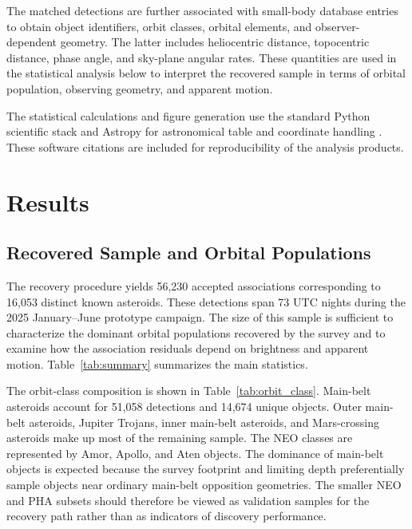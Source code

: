 \documentclass[referee]{raa}
\begin{document}
The matched detections are further associated with small-body database entries to obtain object identifiers, orbit classes, orbital elements, and observer-dependent geometry. The latter includes heliocentric distance, topocentric distance, phase angle, and sky-plane angular rates. These quantities are used in the statistical analysis below to interpret the recovered sample in terms of orbital population, observing geometry, and apparent motion.

The statistical calculations and figure generation use the standard Python scientific stack and Astropy for astronomical table and coordinate handling \citep{Astropy2013,Astropy2018,Astropy2022}. These software citations are included for reproducibility of the analysis products.

\section{Results}
\label{sec:results}

\subsection{Recovered Sample and Orbital Populations}

The recovery procedure yields 56,230 accepted associations corresponding to 16,053 distinct known asteroids. These detections span 73 UTC nights during the 2025 January--June prototype campaign. The size of this sample is sufficient to characterize the dominant orbital populations recovered by the survey and to examine how the association residuals depend on brightness and apparent motion. Table~\ref{tab:summary} summarizes the main statistics.



The orbit-class composition is shown in Table~\ref{tab:orbit_class}. Main-belt asteroids account for 51,058 detections and 14,674 unique objects. Outer main-belt asteroids, Jupiter Trojans, inner main-belt asteroids, and Mars-crossing asteroids make up most of the remaining sample. The NEO classes are represented by Amor, Apollo, and Aten objects. The dominance of main-belt objects is expected because the survey footprint and limiting depth preferentially sample objects near ordinary main-belt opposition geometries. The smaller NEO and PHA subsets should therefore be viewed as validation samples for the recovery path rather than as indicators of discovery performance.


\end{document}
